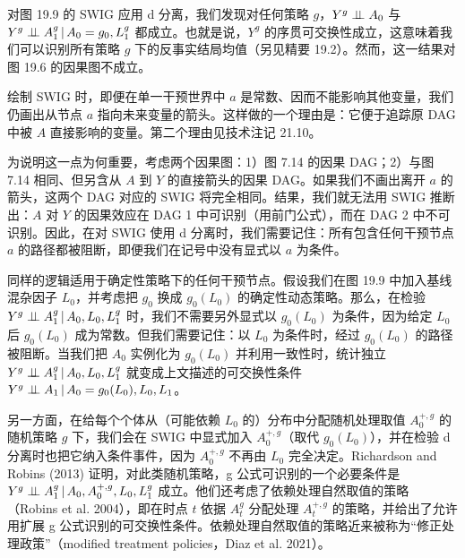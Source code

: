 对图 19.9 的 SWIG 应用 d 分离，我们发现对任何策略 $g$，$Y^g\perp\!\!\!\perp A_0$ 与 $Y^g\perp\!\!\!\perp A_1^g\,|\, A_0=g_0,L_1^g$ 都成立。也就是说，$Y^g$ 的序贯可交换性成立，这意味着我们可以识别所有策略 $g$ 下的反事实结局均值（另见精要 19.2）。然而，这一结果对图 19.6 的因果图不成立。

\begin{figure}[htbp]
\centering
{}
\caption{}
\label{fig:19.10}
\end{figure}

\begin{finepoint}
绘制 SWIG 时，即便在单一干预世界中 $a$ 是常数、因而不能影响其他变量，我们仍画出从节点 $a$ 指向未来变量的箭头。这样做的一个理由是：它便于追踪原 DAG 中被 $A$ 直接影响的变量。第二个理由见技术注记 21.10。

为说明这一点为何重要，考虑两个因果图：1）图 7.14 的因果 DAG；2）与图 7.14 相同、但另含从 $A$ 到 $Y$ 的直接箭头的因果 DAG。如果我们不画出离开 $a$ 的箭头，这两个 DAG 对应的 SWIG 将完全相同。结果，我们就无法用 SWIG 推断出：$A$ 对 $Y$ 的因果效应在 DAG 1 中可识别（用前门公式），而在 DAG 2 中不可识别。因此，在对 SWIG 使用 d 分离时，我们需要记住：所有包含任何干预节点 $a$ 的路径都被阻断，即便我们在记号中没有显式以 $a$ 为条件。

同样的逻辑适用于确定性策略下的任何干预节点。假设我们在图 19.9 中加入基线混杂因子 $L_0$，并考虑把 $g_0$ 换成 $g_0(L_0)$ 的确定性动态策略。那么，在检验 $Y^g\perp\!\!\!\perp A_1^g\,|\, A_0,L_0,L_1^g$ 时，我们不需要另外显式以 $g_0(L_0)$ 为条件，因为给定 $L_0$ 后 $g_0(L_0)$ 成为常数。但我们需要记住：以 $L_0$ 为条件时，经过 $g_0(L_0)$ 的路径被阻断。当我们把 $A_0$ 实例化为 $g_0(L_0)$ 并利用一致性时，统计独立 $Y^g\perp\!\!\!\perp A_1^g\,|\, A_0,L_0,L_1^g$ 就变成上文描述的可交换性条件 $Y^g\perp\!\!\!\perp A_1\,|\, A_0=g_0(L_0),L_0,L_1$。

另一方面，在给每个个体从（可能依赖 $L_0$ 的）分布中分配随机处理取值 $A_0^{+,g}$ 的随机策略 $g$ 下，我们会在 SWIG 中显式加入 $A_0^{+,g}$（取代 $g_0(L_0)$），并在检验 d 分离时也把它纳入条件事件，因为 $A_0^{+,g}$ 不再由 $L_0$ 完全决定。Richardson and Robins (2013) 证明，对此类随机策略，g 公式可识别的一个必要条件是 $Y^g\perp\!\!\!\perp A_1^g\,|\, A_0,A_0^{+,g},L_0,L_1^g$ 成立。他们还考虑了依赖处理自然取值的策略（Robins et al. 2004），即在时点 $t$ 依据 $A_t^{g}$ 分配处理 $A_t^{+,g}$ 的策略，并给出了允许用扩展 g 公式识别的可交换性条件。依赖处理自然取值的策略近来被称为“修正处理政策”（modified treatment policies，Diaz et al. 2021）。
\end{finepoint}

